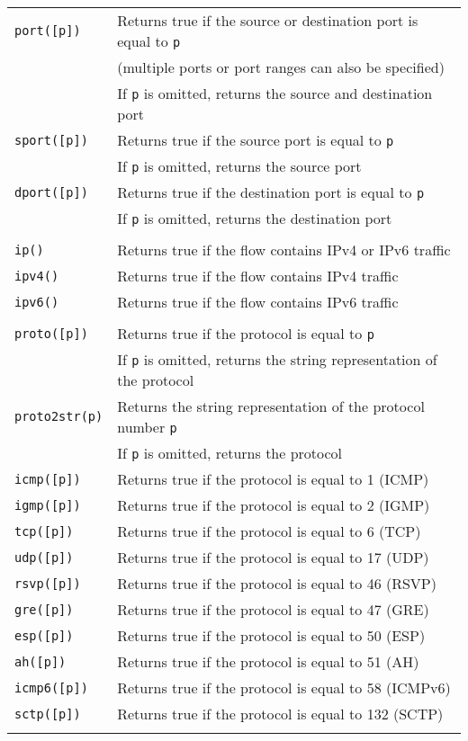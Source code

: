 \documentclass[documentation]{subfiles}
\begin{document}
\begin{longtable}{ll}
    {\tt port([p])}  & Returns true if the source or destination port is equal to {\tt p}\\
                     & (multiple ports or port ranges can also be specified)\\
                     & If {\tt p} is omitted, returns the source and destination port\\
    {\tt sport([p])} & Returns true if the source port is equal to {\tt p}\\
                     & If {\tt p} is omitted, returns the source port\\
    {\tt dport([p])} & Returns true if the destination port is equal to {\tt p}\\
                     & If {\tt p} is omitted, returns the destination port\\\\

    {\tt ip()}       & Returns true if the flow contains IPv4 or IPv6 traffic\\
    {\tt ipv4()}     & Returns true if the flow contains IPv4 traffic\\
    {\tt ipv6()}     & Returns true if the flow contains IPv6 traffic\\\\

    {\tt proto([p])}   & Returns true if the protocol is equal to {\tt p}\\
                       & If {\tt p} is omitted, returns the string representation of the protocol\\
    {\tt proto2str(p)} & Returns the string representation of the protocol number {\tt p}\\
                       & If {\tt p} is omitted, returns the protocol\\
    {\tt icmp([p])}    & Returns true if the protocol is equal to 1 (ICMP)\\
    {\tt igmp([p])}    & Returns true if the protocol is equal to 2 (IGMP)\\
    {\tt tcp([p])}     & Returns true if the protocol is equal to 6 (TCP)\\
    {\tt udp([p])}     & Returns true if the protocol is equal to 17 (UDP)\\
    {\tt rsvp([p])}    & Returns true if the protocol is equal to 46 (RSVP)\\
    {\tt gre([p])}     & Returns true if the protocol is equal to 47 (GRE)\\
    {\tt esp([p])}     & Returns true if the protocol is equal to 50 (ESP)\\
    {\tt ah([p])}      & Returns true if the protocol is equal to 51 (AH)\\
    {\tt icmp6([p])}   & Returns true if the protocol is equal to 58 (ICMPv6)\\
    {\tt sctp([p])}    & Returns true if the protocol is equal to 132 (SCTP)\\\\


\end{longtable}
\end{document}
